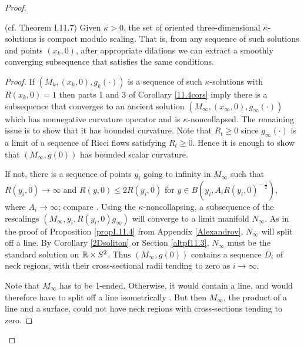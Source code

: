 \begin{proof}
\begin{theorem}
  \label{thm:kl-compactness-space-three-dimensional-solutions-compactness-kappa-solutions}
 (cf. Theorem I.11.7) \label{thmI.11.7}
Given $\kappa > 0$, the set of oriented
three-dimensional $\kappa$-solutions is compact modulo scaling.  That is, from any
sequence of such solutions and points $(x_k, 0)$,
after appropriate dilations
we can extract a
smoothly converging subsequence that satisfies the same conditions.
\end{theorem}
\begin{proof}
If $(M_k, (x_k, 0), g_k(\cdot))$ is a sequence of such $\kappa$-solutions with
$R(x_k, 0) = 1$ then
parts 1 and 3 of Corollary \ref{11.4cors} imply there is a subsequence that
converges to an ancient solution $(M_\infty, (x_\infty, 0), g_\infty(\cdot))$
which has nonnegative curvature operator and is $\kappa$-noncollapsed.
The remaining issue is to show that it has bounded curvature.
Note that $R_t\geq 0$ since $g_\infty(\cdot)$  is  a limit of a sequence
of Ricci flows satisfying $R_t\geq 0$.
Hence it is
enough to show that $(M_\infty, g(0))$ has bounded scalar curvature.

If not, there is a sequence of points $y_i$ going to infinity in $M_\infty$
such that $R(y_i, 0) \rightarrow \infty$ and
$R(y,0) \le 2 R(y_i,0)$ for $y \in B(y_i, A_i R(y_i,0)^{- \: \frac12})$, where
$A_i \rightarrow \infty$; compare \cite[Lemma 22.2]{Hamilton}.
Using the $\kappa$-noncollapsing, a subsequence of the rescalings
$(M_\infty, y_i, R(y_i, 0) g_\infty)$ will converge to a limit manifold
$N_\infty$.
As in the proof of Proposition \ref{propI.11.4}
from Appendix \ref{Alexandrov},
$N_\infty$ will split off a line.
By Corollary \ref{2Dsoliton} or Section \ref{altpf11.3},
$N_\infty$ must be the standard solution
on ${\mathbb R} \times S^2$. Thus $(M_\infty, g(0))$ contains a sequence
$D_i$ of neck regions, with their
cross-sectional radii
tending to zero as
$i \rightarrow \infty$.

Note that $M_\infty$
has to be 1-ended.  Otherwise, it would contain a line,
and would therefore have to split off a line isometrically
\cite[Theorem 8.17]{Cheeger-Ebin}.
But then $M_\infty$, the product of a line and a surface,
could not have neck regions with cross-sections tending to zero.


\end{proof}
\end{proof}
